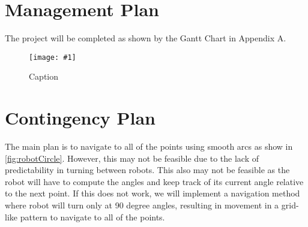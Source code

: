 \documentclass[12pt,conference,onecolumn]{IEEEtran} %
\newcommand{\myfigure}[4]{
  \begin{figure}[h!]
      \centering
      \texttt{[image: \#1]}
      \caption{#2}
\label{#4}
    \end{figure}
}
\begin{document}
\section{Management Plan}
The project will be completed as shown by the Gantt Chart in Appendix A.

\myfigure{images/GanttChart.PNG}{Caption}{1}{fig:gantt}

\section{Contingency Plan}
The main plan is to navigate to all of the points using smooth arcs as show in \cref{fig:robotCircle}. However, this may not be feasible due to the lack of predictability in turning between robots. This also may not be feasible as the robot will have to compute the angles and keep track of its current angle relative to the next point. If this does not work, we will implement a navigation method where robot will turn only at 90 degree angles, resulting in movement in a grid-like pattern to navigate to all of the points.

\pagebreak
\printbibliography{}
\end{document}
